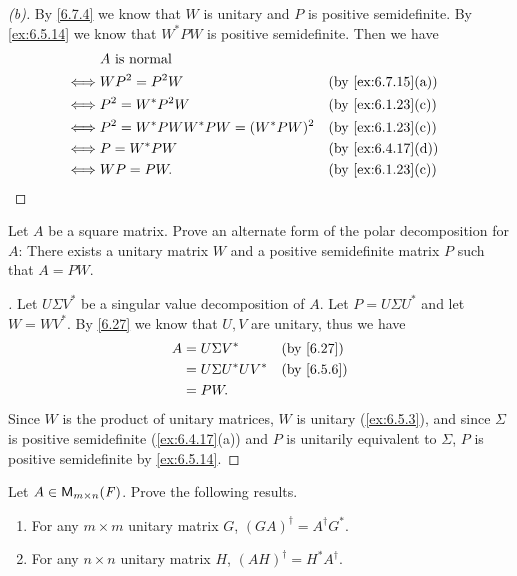 \begin{proof}[(b)]
  By \cref{6.7.4} we know that \(W\) is unitary and \(P\) is positive semidefinite.
  By \cref{ex:6.5.14} we know that \(W^* P W\) is positive semidefinite.
  Then we have
  \begin{align*}
         & A \text{ is normal}                                        \\
    \iff & W P^2 = P^2 W                       &  & \by{ex:6.7.15}[a] \\
    \iff & P^2 = W^* P^2 W                     &  & \by{ex:6.1.23}[c] \\
    \iff & P^2 = W^* P W W^* P W = (W^* P W)^2 &  & \by{ex:6.1.23}[c] \\
    \iff & P = W^* P W                         &  & \by{ex:6.4.17}[d] \\
    \iff & WP = PW.                            &  & \by{ex:6.1.23}[c]
  \end{align*}
\end{proof}

\begin{ex}\label{ex:6.7.16}
  Let \(A\) be a square matrix.
  Prove an alternate form of the polar decomposition for \(A\):
  There exists a unitary matrix \(W\) and a positive semidefinite matrix \(P\) such that \(A = PW\).
\end{ex}

\begin{proof}[]
  Let \(U \Sigma V^*\) be a singular value decomposition of \(A\).
  Let \(P = U \Sigma U^*\) and let \(W = W V^*\).
  By \cref{6.27} we know that \(U, V\) are unitary, thus we have
  \begin{align*}
    A & = U \Sigma V^*       &  & \by{6.27}  \\
      & = U \Sigma U^* U V^* &  & \by{6.5.6} \\
      & = PW.
  \end{align*}
  Since \(W\) is the product of unitary matrices, \(W\) is unitary (\cref{ex:6.5.3}), and since \(\Sigma\) is positive semidefinite (\cref{ex:6.4.17}(a)) and \(P\) is unitarily equivalent to \(\Sigma\), \(P\) is positive semidefinite by \cref{ex:6.5.14}.
\end{proof}

\setcounter{ex}{17}
\begin{ex}\label{ex:6.7.18}
  Let \(A \in \ms\).
  Prove the following results.
  \begin{enumerate}
    \item For any \(m \times m\) unitary matrix \(G\), \((GA)^{\dag} = A^{\dag} G^*\).
    \item For any \(n \times n\) unitary matrix \(H\), \((AH)^{\dag} = H^* A^{\dag}\).
  \end{enumerate}
\end{ex}


